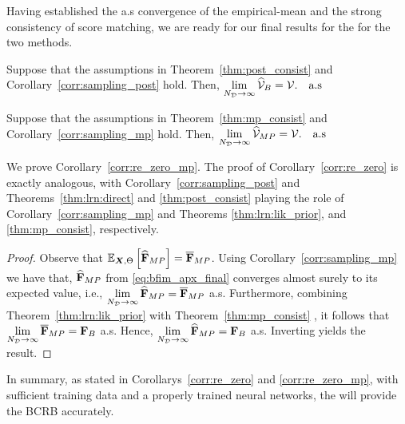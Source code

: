 {Having established the a.s convergence of the empirical-mean  and the strong consistency of score matching, we are ready for our final results for the \name{} for the two methods.}

\begin{corollary} \label{corr:re_zero}
Suppose that {the assumptions in Theorem~\ref{thm:post_consist}} {and Corollary~\ref{corr:sampling_post}} hold. Then,
    $\lim\limits_{N_{\mathcal{D}}\rightarrow \infty } {\widehat{\mathcal{V}}_{B} =\mathcal{V}}. \quad\text{a.s}$
\end{corollary}

\begin{corollary} \label{corr:re_zero_mp}
Suppose that {the assumptions in Theorem~\ref{thm:mp_consist}} {and Corollary~\ref{corr:sampling_mp}} hold. Then,
  $  \lim\limits_{N_{\mathcal{D}}\rightarrow \infty } {\widehat{\mathcal{V}}_{MP}=\mathcal{V}}. \quad\text{a.s}$
\end{corollary}
{
We prove Corollary~\ref{corr:re_zero_mp}. The proof of Corollary~\ref{corr:re_zero} is exactly analogous, with  Corollary~\ref{corr:sampling_post} and Theorems~\ref{thm:lrn:direct} and \ref{thm:post_consist}  playing the role of  Corollary~\ref{corr:sampling_mp} and Theorems
\ref{thm:lrn:lik_prior}, and \ref{thm:mp_consist}, respectively. 
}

{\begin{proof}
   Observe that $\expectation{\lbfimlps}{\X,\pr}=\lbfimlp$.
   Using  Corollary~\ref{corr:sampling_mp} %
   we have that, $\widehat{\mathbf{F}}_{MP}$ 
   from %
   \eqref{eq:bfim_apx_final} converges almost surely to 
   its %
   expected value,%
   i.e., $\lim\limits_{N_{\mathcal{D}}\rightarrow\infty}\widehat{\mathbf{F}}_{MP}=\overline{\mathbf{F}}_{MP}$ a.s.  
   Furthermore, combining
   Theorem~\ref{thm:lrn:lik_prior} 
   with Theorem~\ref{thm:mp_consist}
   , it follows that $\lim\limits_{N_{\mathcal{D}}\rightarrow\infty} \overline{\mathbf{F}}_{MP}=\mathbf{F}_{B}$ a.s.
 Hence, $\lim\limits_{N_{\mathcal{D}}\rightarrow\infty}\widehat{\mathbf{F}}_{MP}=\mathbf{F}_{B}$ a.s.  
 Inverting yields the result. 
\end{proof}
}

{In summary, } as stated in Corollarys~\ref{corr:re_zero} and \ref{corr:re_zero_mp}, with sufficient training data and a properly trained neural networks, the\name{} {will provide the BCRB accurately}. 